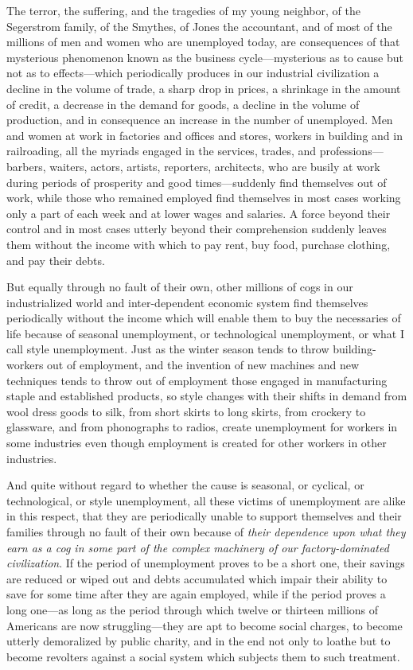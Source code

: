 \documentclass{book}
\begin{document}
The terror, the suffering, and the tragedies of my young neighbor, of the Segerstrom family, of the Smythes, of Jones the accountant, and of most of the millions of men and women who are unemployed today, are consequences of that mysterious phenomenon known as the business cycle—mysterious as to cause but not as to effects—which periodically produces in our industrial civilization a decline in the volume of trade, a sharp drop in prices, a shrinkage in the amount of credit, a decrease in the demand for goods, a decline in the volume of production, and in consequence an increase in the number of unemployed. Men and women at work in factories and offices and stores, workers in building and in railroading, all the myriads engaged in the services, trades, and professions—barbers, waiters, actors, artists, reporters, architects, who are busily at work during periods of prosperity and good times—suddenly find themselves out of work, while those who remained employed find themselves in most cases working only a part of each week and at lower wages and salaries. A force beyond their control and in most cases utterly beyond their comprehension suddenly leaves them without the income with which to pay rent, buy food, purchase clothing, and pay their debts.

But equally through no fault of their own, other millions of cogs in our industrialized world and inter-dependent economic system find themselves periodically without the income which will enable them to buy the necessaries of life because of seasonal unemployment, or technological unemployment, or what I call style unemployment. Just as the winter season tends to throw building-workers out of employment, and the invention of new machines and new techniques tends to throw out of employment those engaged in manufacturing staple and established products, so style changes with their shifts in demand from wool dress goods to silk, from short skirts to long skirts, from crockery to glassware, and from phonographs to radios, create unemployment for workers in some industries even though employment is created for other workers in other industries.

And quite without regard to whether the cause is seasonal, or cyclical, or technological, or style unemployment, all these victims of unemployment are alike in this respect, that they are periodically unable to support themselves and their families through no fault of their own because of \emph{their dependence upon what they earn as a cog in some part of the complex machinery of our factory-dominated civilization}. If the period of unemployment proves to be a short one, their savings are reduced or wiped out and debts accumulated which impair their ability to save for some time after they are again employed, while if the period proves a long one—as long as the period through which twelve or thirteen millions of Americans are now struggling—they are apt to become social charges, to become utterly demoralized by public charity, and in the end not only to loathe but to become revolters against a social system which subjects them to such treatment.
\end{document}
